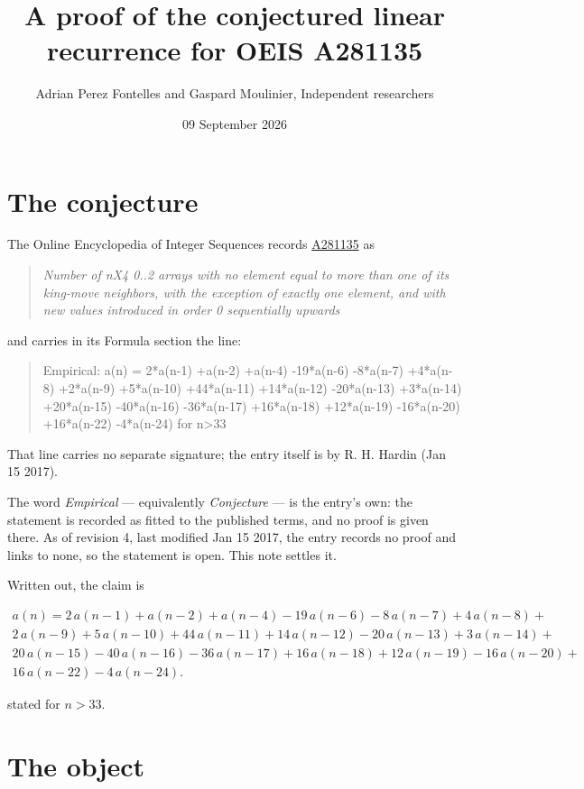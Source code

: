 \documentclass[11pt]{article}
\title{A proof of the conjectured linear recurrence for OEIS A281135}
\author{Adrian Perez Fontelles and Gaspard Moulinier, Independent researchers}
\date{09 September 2026}
\theoremstyle{definition}
\begin{document}
\maketitle
\section{The conjecture}

The Online Encyclopedia of Integer Sequences records \href{https://oeis.org/A281135}{A281135} as

\begin{quote}\itshape Number of nX4 0..2 arrays with no element equal to more than one of its king-move neighbors, with the exception of exactly one element, and with new values introduced in order 0 sequentially upwards\end{quote}

and carries in its Formula section the line:

\begin{quote}\ttfamily Empirical: a(n) = 2*a(n-1) +a(n-2) +a(n-4) -19*a(n-6) -8*a(n-7) +4*a(n-8) +2*a(n-9) +5*a(n-10) +44*a(n-11) +14*a(n-12) -20*a(n-13) +3*a(n-14) +20*a(n-15) -40*a(n-16) -36*a(n-17) +16*a(n-18) +12*a(n-19) -16*a(n-20) +16*a(n-22) -4*a(n-24) for n>33\end{quote}

That line carries no separate signature; the entry itself is by R. H. Hardin (Jan 15 2017).

The word {\itshape Empirical} --- equivalently {\itshape Conjecture} --- is the entry's own: the statement is recorded as fitted to the published terms, and no proof is given there. As of revision 4, last modified Jan 15 2017, the entry records no proof and links to none, so the statement is open. This note settles it.

Written out, the claim is

\begin{multline*} a(n) = 2\,a(n-1) + a(n-2) + a(n-4) - 19\,a(n-6) - 8\,a(n-7) + 4\,a(n-8) + \\ 2\,a(n-9) + 5\,a(n-10) + 44\,a(n-11) + 14\,a(n-12) - 20\,a(n-13) + 3\,a(n-14) + \\ 20\,a(n-15) - 40\,a(n-16) - 36\,a(n-17) + 16\,a(n-18) + 12\,a(n-19) - 16\,a(n-20) + \\ 16\,a(n-22) - 4\,a(n-24). \end{multline*}

stated for $n > 33$.

\section{The object}
\end{document}

